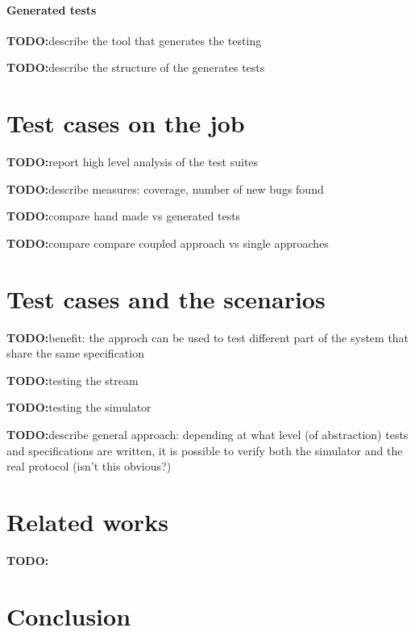 \documentclass{article}
\newcommand{\todo}{\textbf{TODO:}}
\begin{document}
\paragraph*{Generated tests}

\todo describe the tool that generates the testing

\todo describe the structure of the generates tests


\section{Test cases on the job}
\label{sec:test_cases_on_the_job}

\todo report high level analysis of the test suites

\todo describe measures: coverage, number of new bugs found

\todo compare hand made vs generated tests

\todo compare compare coupled approach vs single approaches


\section{Test cases and the scenarios}
\label{sec:test_cases_and_the_scenarios}

\todo benefit: the approch can be used to test different part of the system
that share the same specification

\todo testing the stream

\todo testing the simulator

\todo describe general approach: depending at what level (of abstraction) tests 
and specifications are written, it is possible to verify both the simulator and 
the real protocol (isn't this obvious?)


\section{Related works}
\label{sec:related_works}

\todo

\section{Conclusion}
\label{sec:conclusion}
\end{document}
